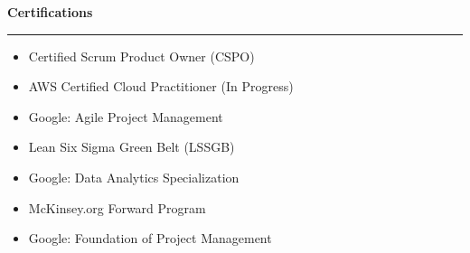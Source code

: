 \documentclass[9pt,letterpaper]{article} %
\newenvironment{rSection}[1]{ %
  \sectionskip
 \textbf{\Large #1} %
  \sectionlineskip
  \hrule %
  \begin{list}{}{ %
    \setlength{\leftmargin}{-0em} %
  }
  \item[]
}{
  \end{list}
}
\def\sectionlineskip{\smallskip} %
\def\sectionskip{} %
\begin{document}
\begin{rSection}{Certifications}
\item[] \vspace{-1em}
\begin{itemize}[left=-1.5em, labelsep=.1cm, labelwidth=.2cm, itemsep=0.0em]

\item Certified Scrum Product Owner (CSPO)

\item AWS Certified Cloud Practitioner (In Progress)

\item Google: Agile Project Management

\item Lean Six Sigma Green Belt (LSSGB)

\item Google: Data Analytics Specialization

\item McKinsey.org Forward Program

\item Google: Foundation of Project Management

\end{itemize}
\end{rSection}
\end{document}
